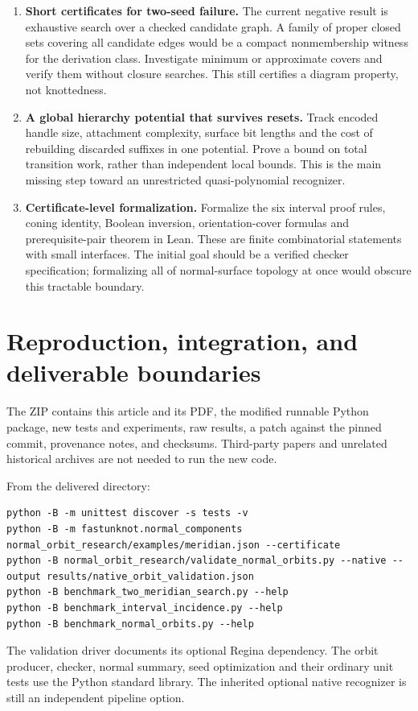 \documentclass[11pt,a4paper]{article}
\theoremstyle{definition}\newtheorem{definition}[theorem]{Definition}
\theoremstyle{remark}\newtheorem{remark}[theorem]{Remark}
\begin{document}
\begin{enumerate}[label=\textbf{\arabic*.},itemsep=6pt]
\item \textbf{Short certificates for two-seed failure.}
The current negative result is exhaustive search over a checked candidate
graph. A family of proper closed sets covering all candidate edges would
be a compact nonmembership witness for the derivation class. Investigate
minimum or approximate covers and verify them without closure searches.
This still certifies a diagram property, not knottedness.

\item \textbf{A global hierarchy potential that survives resets.}
Track encoded handle size, attachment complexity, surface bit lengths
and the cost of rebuilding discarded suffixes in one potential. Prove a
bound on total transition work, rather than independent local bounds.
This is the main missing step toward an unrestricted quasi-polynomial
recognizer.

\item \textbf{Certificate-level formalization.}
Formalize the six interval proof rules, coning identity, Boolean inversion,
orientation-cover formulas and prerequisite-pair theorem in Lean. These
are finite combinatorial statements with small interfaces. The initial
goal should be a verified checker specification; formalizing all of
normal-surface topology at once would obscure this tractable boundary.
\end{enumerate}

\section{Reproduction, integration, and deliverable boundaries}
\label{sec:reproduce}

The ZIP contains this article and its PDF, the modified runnable Python
package, new tests and experiments, raw results, a patch against the pinned
commit, provenance notes, and checksums. Third-party papers and unrelated
historical archives are not needed to run the new code.

From the delivered  directory:
\begin{lstlisting}
python -B -m unittest discover -s tests -v
python -B -m fastunknot.normal_components normal_orbit_research/examples/meridian.json --certificate
python -B normal_orbit_research/validate_normal_orbits.py --native --output results/native_orbit_validation.json
python -B benchmark_two_meridian_search.py --help
python -B benchmark_interval_incidence.py --help
python -B benchmark_normal_orbits.py --help
\end{lstlisting}
The validation driver documents its optional Regina dependency. The orbit
producer, checker, normal summary, seed optimization and their ordinary
unit tests use the Python standard library. The inherited optional native
recognizer is still an independent pipeline option.
\end{document}
